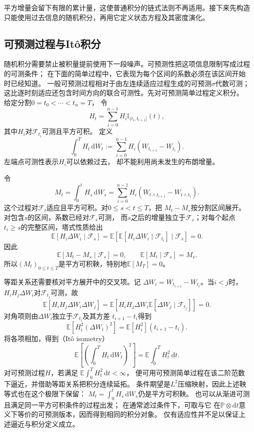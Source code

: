 平方增量会留下有限的累计量，这使普通积分的链式法则不再适用。接下来先构造只能使用过去信息的随机积分，再用它定义状态方程及其密度演化。

\subsection{可预测过程与Itô积分}

随机积分需要禁止被积量提前使用下一段噪声。可预测性把这项信息限制写成过程的可测条件；
在下面的简单过程中，它表现为每个区间的系数必须在该区间开始时已经知道。
一般可预测过程相对于由左连续适应过程生成的可预测$\sigma$代数可测；
这比逐时刻适应还包含时间方向的联合可测性。先对可预测简单过程定义积分。 给定分割$0=t_{0}<\cdots<t_{n}=T$， 令
\[
	H_{t}= \sum_{i=0}^{n-1}H_{i}\mathbb{I}_{(t_i,t_{i+1}]}(t),
\]
其中$H_{i}$对$\mathcal{F}_{t_i}$可测且平方可积。 定义
\begin{equation}
	\int_{0}^{T}H_{t}\,\mathrm{d}W_{t}:=
	\sum_{i=0}^{n-1}H_{i}(W_{t_{i+1}}-W_{t_i}). \label{eq:dynamical-simple-ito-integral}
\end{equation}
左端点可测性表示$H_{i}$可以依赖过去， 却不能利用尚未发生的布朗增量。

令
\[
	M_t=\int_0^t H_s\,\mathrm{d}W_s
	=\sum_{i=0}^{n-1}H_i
	\left(W_{t\wedge t_{i+1}}-W_{t\wedge t_i}\right).
\]
这个过程对$\mathcal F_t$适应且平方可积。对$0\leq s<t\leq T$，把
$M_t-M_s$按分割区间展开。对包含$s$的区间，系数已经对$\mathcal F_s$可测，
而$s$之后的增量独立于$\mathcal F_s$；对每个起点$t_i\geq s$的完整区间，塔式性质给出
\[
	\mathbb{E}[H_i\Delta W_i\mid\mathcal F_s]
	=
	\mathbb{E}\!\left[
	\mathbb{E}[H_i\Delta W_i\mid\mathcal F_{t_i}]
	\mid\mathcal F_s
	\right]
	=0.
\]
因此
\[
	\mathbb{E}[M_t-M_s\mid\mathcal F_s]=0,
	\qquad
	\mathbb{E}[M_t\mid\mathcal F_s]=M_s.
\]
所以$(M_t)_{0\leq t\leq T}$是平方可积鞅，特别地$\mathbb{E}[M_T]=0$。

等距关系还需要核对平方展开中的交叉项。记
$\Delta W_i=W_{t_{i+1}}-W_{t_i}$。当$i<j$时，
$H_iH_j\Delta W_i$对$\mathcal F_{t_j}$可测，故
\[
	\mathbb{E}[H_iH_j\Delta W_i\Delta W_j]
	=
	\mathbb{E}\!\left[
	H_iH_j\Delta W_i
	\mathbb{E}[\Delta W_j\mid\mathcal F_{t_j}]
	\right]
	=0.
\]
对角项则由$\Delta W_i$独立于$\mathcal F_{t_i}$及其方差
$t_{i+1}-t_i$得到
\[
	\mathbb{E}[H_i^2(\Delta W_i)^2]
	=\mathbb{E}[H_i^2](t_{i+1}-t_i).
\]
将各项相加，得到（Itô isometry）
\begin{equation}
	\mathbb{E}\left[ \left( \int_{0}^{T}H_{t}\,\mathrm{d}W_{t}\right)^{2}\right] = \mathbb{E}
	\int_{0}^{T}H_{t}^{2}\,\mathrm{d}t. \label{eq:dynamical-ito-isometry}
\end{equation}
对可预测过程$H$，若满足 $\mathbb{E}\int_{0}^{T}H_{t}^{2}\,\mathrm{d}t<\infty$，
便可用可预测简单过程在该二阶范数下逼近，并借助等距关系把积分连续延拓。
条件期望是$L^2$压缩映射，因此上述鞅等式也在这个极限下保留：
$M_t=\int_0^tH_s\,\mathrm dW_s$仍是平方可积鞅。
也可以从渐进可测且满足同一平方可积条件的过程出发； 在通常滤过条件下，可取与它
在$\mathbb{P}\otimes\mathrm{d}t$意义下等价的可预测版本，因而得到相同的积分对象。
仅有适应性并不足以保证上述逼近与积分定义成立。

